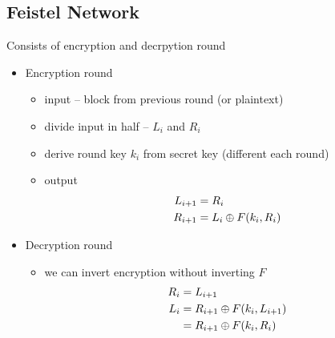 \documentclass[draft]{article}
\begin{document}
\subsection{Feistel Network}
Consists of encryption and decrpytion round
\begin{itemize}[nosep]
    \item Encryption round
          \begin{itemize}[nosep]
              \item input -- block from previous round (or plaintext)
              \item divide input in half -- $L_i$ and $R_i$
              \item derive round key $k_i$ from secret key (different each round)
              \item output
                    \begin{align*}
                        L_{i+1} & = R_i                  \\
                        R_{i+1} & = L_i \oplus F(k_i, R_i)
                    \end{align*}
          \end{itemize}
    \item Decryption round
          \begin{itemize}[nosep]
              \item we can invert encryption without inverting $F$
                    \begin{align*}
                        R_i & = L_{i + 1}                        \\
                        L_i & = R_{i + 1} \oplus F(k_i, L_{i + 1}) \\
                            & = R_{i + 1} \oplus F(k_i, R_i)
                    \end{align*}
          \end{itemize}
\end{itemize}
\end{document}
